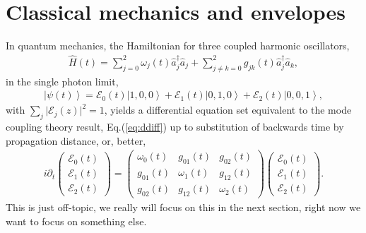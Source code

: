 \documentclass[9pt,twocolumn,twoside]{osajnl}
\begin{document}
\section{Classical mechanics and envelopes}
In quantum mechanics, the Hamiltonian for three coupled harmonic oscillators, 
\begin{eqnarray}
	\hat{H}(t) = \sum_{j=0}^{2} \omega_j(t) \hat{a}^{\dagger}_j \hat{a}_{j} + \sum_{j\neq k=0}^{2} g_{jk}(t) \hat{a}^{\dagger}_j \hat{a}_k,
\end{eqnarray}
in the single photon limit,
\begin{eqnarray}
	\left\vert \psi(t) \right\rangle = \mathcal{E}_{0}(t) \left\vert 1, 0, 0 \right\rangle  +
	\mathcal{E}_{1}(t) \left\vert 0,1,0 \right\rangle + \mathcal{E}_{2}(t) \left\vert 0,0,1 \right\rangle,
\end{eqnarray}
with $ \sum_{j} \vert \mathcal{E}_{j}(z) \vert^2 = 1$, yields a differential equation set equivalent to the mode coupling theory result, Eq.(\ref{eq:ddiff}) up to substitution of backwards time by propagation distance, or, better, 
\begin{eqnarray}
	i \partial_t	
	\left( \begin{array}{c} 
		\mathcal{E}_{0}(t) \\
		\mathcal{E}_{1}(t) \\
		\mathcal{E}_{2}(t)
	\end{array} \right) =
	\left( \begin{array}{ccc} 
		\omega_{0}(t)  & g_{01}(t) & g_{02}(t) \\
		g_{01}(t) & \omega_{1}(t) & g_{12}(t) \\
		g_{02}(t) & g_{12}(t) & \omega_{2}(t)
	\end{array} \right)
	\left( \begin{array}{c} 
		\mathcal{E}_{0}(t) \\
		\mathcal{E}_{1}(t) \\
		\mathcal{E}_{2}(t)
	\end{array} \right) .
\end{eqnarray}
This is just off-topic, we really will focus on this in the next section, right now we want to focus on something else.
\end{document}
